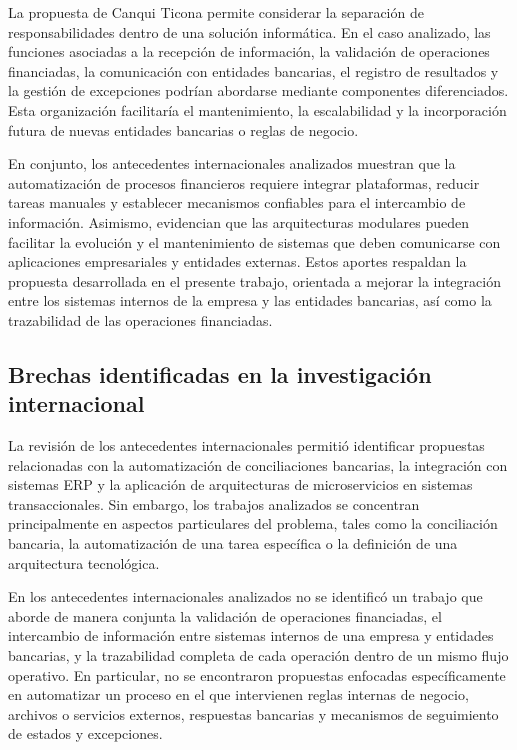 La propuesta de Canqui Ticona permite considerar la separación de responsabilidades dentro de una solución informática. En el caso analizado, las funciones asociadas a la recepción de información, la validación de operaciones financiadas, la comunicación con entidades bancarias, el registro de resultados y la gestión de excepciones podrían abordarse mediante componentes diferenciados. Esta organización facilitaría el mantenimiento, la escalabilidad y la incorporación futura de nuevas entidades bancarias o reglas de negocio.

En conjunto, los antecedentes internacionales analizados muestran que la automatización de procesos financieros requiere integrar plataformas, reducir tareas manuales y establecer mecanismos confiables para el intercambio de información. Asimismo, evidencian que las arquitecturas modulares pueden facilitar la evolución y el mantenimiento de sistemas que deben comunicarse con aplicaciones empresariales y entidades externas. Estos aportes respaldan la propuesta desarrollada en el presente trabajo, orientada a mejorar la integración entre los sistemas internos de la empresa y las entidades bancarias, así como la trazabilidad de las operaciones financiadas.

\subsection{Brechas identificadas en la investigación internacional}

La revisión de los antecedentes internacionales permitió identificar propuestas relacionadas con la automatización de conciliaciones bancarias, la integración con sistemas ERP y la aplicación de arquitecturas de microservicios en sistemas transaccionales. Sin embargo, los trabajos analizados se concentran principalmente en aspectos particulares del problema, tales como la conciliación bancaria, la automatización de una tarea específica o la definición de una arquitectura tecnológica.

En los antecedentes internacionales analizados no se identificó un trabajo que aborde de manera conjunta la validación de operaciones financiadas, el intercambio de información entre sistemas internos de una empresa y entidades bancarias, y la trazabilidad completa de cada operación dentro de un mismo flujo operativo. En particular, no se encontraron propuestas enfocadas específicamente en automatizar un proceso en el que intervienen reglas internas de negocio, archivos o servicios externos, respuestas bancarias y mecanismos de seguimiento de estados y excepciones.

